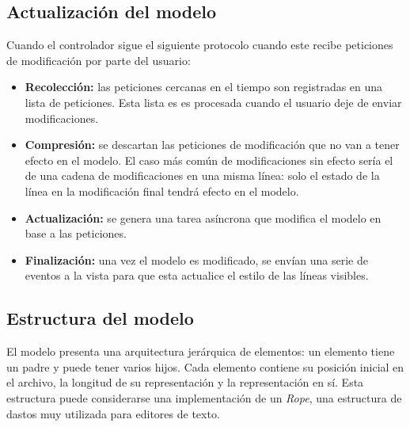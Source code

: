 \subsection{Actualización del modelo}\label{subsec:actualizacion-del-modelo}

Cuando el controlador sigue el siguiente
protocolo cuando este recibe peticiones de modificación
por parte del usuario:
\begin{itemize}
    \item \textbf{Recolección:} las peticiones cercanas
    en el tiempo son registradas en una lista de peticiones.
    Esta lista es es procesada cuando el usuario deje
    de enviar modificaciones.
    \item \textbf{Compresión:} se descartan las peticiones
    de modificación que no van a tener efecto en el modelo.
    El caso más común de modificaciones sin efecto sería
    el de una cadena de modificaciones en una misma línea:
    solo el estado de la línea en la modificación final
    tendrá efecto en el modelo.
    \item \textbf{Actualización:} se genera una tarea
    asíncrona que modifica el modelo en base a las
    peticiones.
    \item \textbf{Finalización:} una vez el modelo
    es modificado, se envían una serie de eventos
    a la vista para que esta actualice el estilo
    de las líneas visibles.
\end{itemize}

\subsection{Estructura del modelo}\label{subsec:estructura-del-modelo}

El modelo presenta una arquitectura jerárquica de elementos:
un elemento tiene un padre y puede tener varios hijos.
Cada elemento contiene su posición inicial en el archivo, la
longitud de su representación y la representación en sí.
Esta estructura puede considerarse una implementación de un
\textit{Rope}\cite{ROPES}, una estructura de dastos muy
utilizada para editores de texto.

\begin{center}
\end{center}

